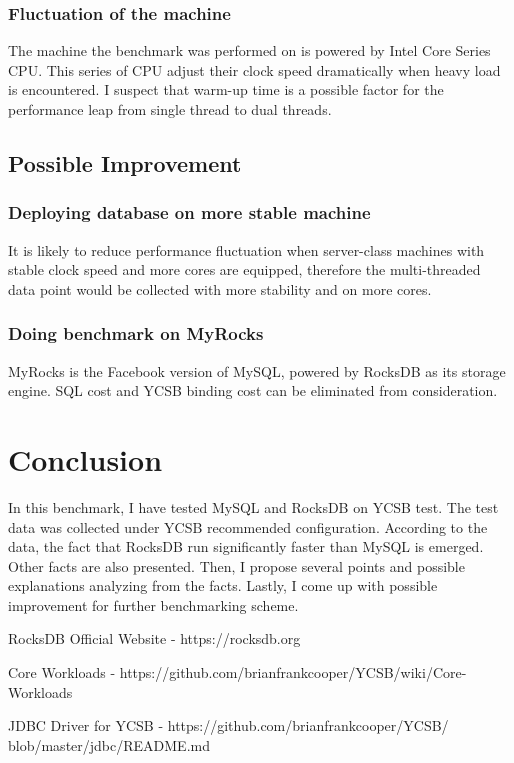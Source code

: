 \documentclass[journal]{IEEEtran}
\begin{document}
\subsubsection{Fluctuation of the machine} The machine the benchmark was performed on is powered by Intel Core Series CPU. This series of CPU adjust their clock speed dramatically when heavy load is encountered. I suspect that warm-up time is a possible factor for the performance leap from single thread to dual threads.

\subsection{Possible Improvement}

\subsubsection{Deploying database on more stable machine} It is likely to reduce performance fluctuation when server-class machines with stable clock speed and more cores are equipped, therefore the multi-threaded data point would be collected with more stability and on more cores.

\subsubsection{Doing benchmark on MyRocks} MyRocks is the Facebook version of MySQL, powered by RocksDB as its storage engine. SQL cost and YCSB binding cost can be eliminated from consideration.

\section{Conclusion}

In this benchmark, I have tested MySQL and RocksDB on YCSB test. The test data was collected under YCSB recommended configuration. According to the data, the fact that RocksDB run significantly faster than MySQL is emerged. Other facts are also presented. Then, I propose several points and possible explanations analyzing from the facts. Lastly, I come up with possible improvement for further benchmarking scheme.

\begin{thebibliography}{2}

RocksDB Official Website - https://rocksdb.org

Core Workloads - https://github.com/brianfrankcooper/YCSB/wiki/Core-Workloads

JDBC Driver for YCSB - https://github.com/brianfrankcooper/YCSB/\\ blob/master/jdbc/README.md

\end{thebibliography}
\end{document}
